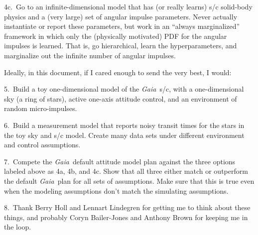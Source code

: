 \documentclass[12pt]{article}
\newcommand{\project}[1]{\textsl{#1}}
\newcommand{\gaia}{\project{Gaia}}
\begin{document}
4c.~Go to an infinite-dimensional model that has (or really learns)
s/c solid-body physics and a (very large) set of angular impulse
parameters.  Never actually instantiate or report these parameters,
but work in an ``always marginalized'' framework in which only the
(physically motivated) PDF for the angular impulses is learned.  That
is, go hierarchical, learn the hyperparameters, and marginalize out
the infinite number of angular impulses.

Ideally, in this document, if I cared enough to send the very best, I
would:

5.~Build a toy one-dimensional model of the \gaia\ s/c, with a
one-dimensional sky (a ring of stars), active one-axis attitude
control, and an environment of random micro-impulses.

6.~Build a measurement model that reports noisy transit times for the
stars in the toy sky and s/c model.  Create many data sets under
different environment and control assumptions.

7.~Compete the \gaia\ default attitude model plan against the three
options labeled above as 4a, 4b, and 4c.  Show that all three either
match or outperform the default \gaia\ plan for all sets of
assumptions.  Make sure that this is true even when the modeling
assumptions don't match the simulating assumptions.

8.~Thank Berry Holl and Lennart Lindegren for getting me to think
about these things, and probably Coryn Bailer-Jones and Anthony Brown
for keeping me in the loop.
\end{document}
